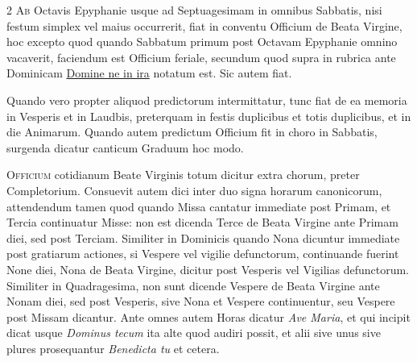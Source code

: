 \begin{multicols*}{2}
\lettrine[lines=2]{\zallmancaps \color{Blue} A}{b} Octavis Epyphanie usque ad Septuagesimam in omnibus Sabbatis, nisi festum simplex vel maius occurrerit, fiat in conventu Officium de Beata Virgine, hoc excepto quod quando Sabbatum primum post Octavam Epyphanie omnino vacaverit, faciendum est Officium feriale, secundum quod supra in rubrica ante Dominicam \hyperlink{domine-ne-in-ira}{Domine ne in ira} notatum est. Sic autem fiat.

\newline Quando vero propter aliquod predictorum intermittatur, tunc fiat de ea memoria in Vesperis et in Laudbis, preterquam in festis duplicibus et totis duplicibus, et in die Animarum.
Quando autem predictum Officium fit in choro in Sabbatis, surgenda dicatur canticum Graduum hoc modo.


\lettrine[lines=2]{\zallmancaps \color{Red} O}{fficium} cotidianum Beate Virginis totum dicitur extra chorum, preter Completorium. Consuevit autem dici inter duo signa horarum canonicorum, attendendum tamen quod quando Missa cantatur immediate post Primam, et Tercia continuatur Misse: non est dicenda Terce de Beata Virgine ante Primam diei, sed post Terciam. Similiter in Dominicis quando Nona dicuntur immediate post gratiarum actiones, si Vespere vel vigilie defunctorum, continuande fuerint None diei, Nona de Beata Virgine, dicitur post Vesperis vel Vigilias defunctorum. Similiter in Quadragesima, non sunt dicende Vespere de Beata Virgine ante Nonam diei, sed post Vesperis, sive Nona et Vespere continuentur, seu Vespere post Missam dicantur.
Ante omnes autem Horas dicatur \textit{Ave Maria}, et qui incipit dicat usque \textit{Dominus tecum} ita alte quod audiri possit, et alii sive unus sive plures prosequantur \textit{Benedicta tu} et cetera.


\end{multicols*}

